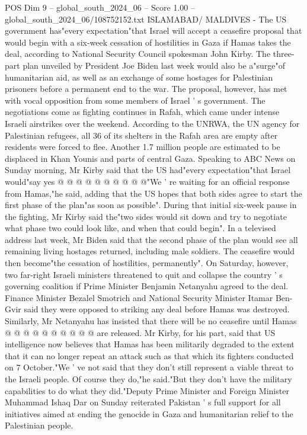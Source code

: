 \begin{textsample}{POS Dim 9 – global\_south\_2024\_06 – Score 1.00 – global\_south\_2024\_06/108752152.txt}  \label{ex:f9_pos_088}
ISLAMABAD/ MALDIVES - The US government has"every expectation"that Israel will accept a ceasefire proposal that would begin with a six-week cessation of hostilities in Gaza if Hamas takes the deal, according to National Security Council spokesman John Kirby.
The three-part plan unveiled by President Joe Biden last week would also be a"surge"of humanitarian aid, as well as an exchange of some hostages for Palestinian prisoners before a permanent end to the war.
The proposal, however, has met with vocal opposition from some members of Israel ' s government.
The negotiations come as fighting continues in Rafah, which came under intense Israeli airstrikes over the weekend.
According to the UNRWA, the UN agency for Palestinian refugees, all 36 of its shelters in the Rafah area are empty after residents were forced to flee.
Another 1.7 million people are estimated to be displaced in Khan Younis and parts of central Gaza.
Speaking to ABC News on Sunday morning, Mr Kirby said that the US had"every expectation"that Israel would"say yes @ @ @ @ @ @ @ @ @ @"We ' re waiting for an official response from Hamas,"he said, adding that the US hopes that both sides agree to start the first phase of the plan"as soon as possible".
During that initial six-week pause in the fighting, Mr Kirby said the"two sides would sit down and try to negotiate what phase two could look like, and when that could begin".
In a televised address last week, Mr Biden said that the second phase of the plan would see all remaining living hostages returned, including male soldiers.
The ceasefire would then become"the cessation of hostilities, permanently".
On Saturday, however, two far-right Israeli ministers threatened to quit and collapse the country ' s governing coalition if Prime Minister Benjamin Netanyahu agreed to the deal.
Finance Minister Bezalel Smotrich and National Security Minister Itamar Ben-Gvir said they were opposed to striking any deal before Hamas was destroyed.
Similarly, Mr Netanyahu has insisted that there will be no ceasefire until Hamas @ @ @ @ @ @ @ @ @ @ are released.
Mr Kirby, for his part, said that US intelligence now believes that Hamas has been militarily degraded to the extent that it can no longer repeat an attack such as that which its fighters conducted on 7 October."We ' ve not said that they don't still represent a viable threat to the Israeli people.
Of course they do,"he said."But they don't have the military capabilities to do what they did."Deputy Prime Minister and Foreign Minister Muhammad Ishaq Dar on Sunday reiterated Pakistan ' s full support for all initiatives aimed at ending the genocide in Gaza and humanitarian relief to the Palestinian people.

\end{textsample}
